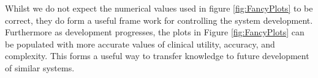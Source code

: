 \documentclass[3p,twocolumn,preprint,10pt]{elsarticle}
\newcommand{\Tlens}{$\mathcal{T}_{Patient \Rightarrow Screen}$}
\newcommand{\Tsystem}{$\mathcal{T}_{MRI \Rightarrow Screen}$}
\begin{document}
Whilst we do not expect the numerical values used in figure \ref{fig:FancyPlots} to be correct, 
they do form a useful frame work for controlling the system development.
Furthermore as development progresses, the plots in Figure \ref{fig:FancyPlots} can be populated with
more accurate values of clinical utility, accuracy, and complexity. This forms a useful way to 
transfer knowledge to future development of similar systems.



\end{document}
